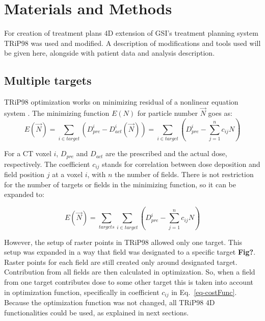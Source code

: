 \documentclass[type=dr, dr=rernat, accentcolor=tud7b,colorbacktitle, bigchapter, openright, twoside, 12pt ]{tudthesis}
\begin{document}

\section{Materials and Methods}

For creation of treatment plans 4D extension of GSI's treatment planning system TRiP98 \cite{Kraemer2000a, Richter2013} was used and modified. A description of modifications and tools used will be given here, 
alongside with patient data and analysis description.

\subsection{Multiple targets}

TRiP98 optimization works on minimizing residual of a nonlinear equation system \cite{Kraemer2000a}. The minimizing function $E(N)$ for particle number $\vec{N}$ goes as:
\begin{equation}
\label{eq-costFunc}
 E(\vec{N}) = \sum_{i\in target} \left( D_{pre}^{i} - D_{act}^{i}(\vec{N})\right) = \sum_{i\in target} \left( D_{pre}^{i} -\sum_{j=1}^n c_{ij}N\right)
\end{equation}

For a CT voxel $i$, $ D_{pre}$ and $D_{act}$ are the prescribed and the actual dose, respectively. The coefficient $c_{ij}$ stands for correlation between dose deposition and field position $j$ at a voxel $i$, with $n$ the number of fields. There is not restriction for the number of targets or fields in the minimizing function, so it can be expanded to:

\begin{equation}
\label{eq-multiCost}
 E(\vec{N}) = \sum_{targets} \sum_{i\in target} \left( D_{pre}^{i} -\sum_{j=1}^n c_{ij}N\right)
\end{equation}

However, the setup of raster points in TRiP98 allowed only one target. This setup was expanded in a way that field was designated to a specific target \textbf{Fig?}. Raster points for each field are still created only around designated target. Contribution from all fields are then calculated in optimization. So, when a field from one target contributes dose to some other target this is taken into account in optimization function, specifically in coefficient $c_{ij}$ in Eq.~\ref{eq-costFunc}. Because the optimization function was not changed, all TRiP98 4D functionalities could be used, as explained in next sections.
\end{document}
